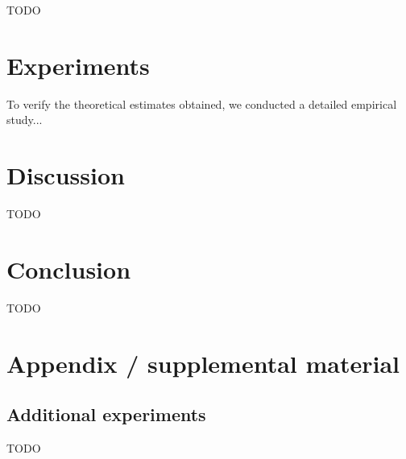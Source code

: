 \documentclass{article}
\begin{document}
TODO

\section{Experiments}\label{sec:exp}

To verify the theoretical estimates obtained, we conducted a detailed empirical study...

\section{Discussion}\label{sec:disc}

TODO

\section{Conclusion}\label{sec:concl}

TODO







\newpage
\appendix
\section{Appendix / supplemental material}\label{app}

\subsection{Additional experiments}\label{app:exp}

TODO
\end{document}
